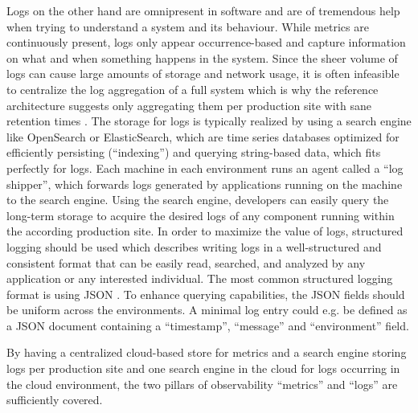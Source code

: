     Logs on the other hand are omnipresent in software and are of tremendous help when trying to understand a system and its behaviour. While metrics are continuously present, logs only appear occurrence-based and capture information on what and when something happens in the system. Since the sheer volume of logs can cause large amounts of storage and network usage, it is often infeasible to centralize the log aggregation of a full system which is why the reference architecture suggests only aggregating them per production site with sane retention times \cite{building_iiot}. The storage for logs is typically realized by using a search engine like OpenSearch or ElasticSearch, which are time series databases optimized for efficiently persisting (``indexing'') and querying string-based data, which fits perfectly for logs. Each machine in each environment runs an agent called a ``log shipper'', which forwards logs generated by applications running on the machine to the search engine. Using the search engine, developers can easily query the long-term storage to acquire the desired logs of any component running within the according production site. In order to maximize the value of logs, structured logging should be used which describes writing logs in a well-structured and consistent format that can be easily read, searched, and analyzed by any application or any interested individual. The most common structured logging format is using JSON \cite{sematext_structured_logging}. To enhance querying capabilities, the JSON fields should be uniform across the environments. A minimal log entry could e.g. be defined as a JSON document containing a ``timestamp'', ``message'' and ``environment'' field.\newline

    By having a centralized cloud-based store for metrics and a search engine storing logs per production site and one search engine in the cloud for logs occurring in the cloud environment, the two pillars of observability ``metrics'' and ``logs'' are sufficiently covered. \newpage
